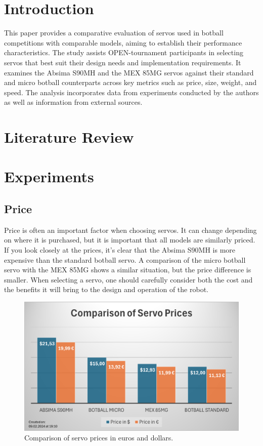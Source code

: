 \documentclass[conference]{IEEEtran}
\begin{document}
\section{Introduction}
This paper provides a comparative evaluation of servos used in botball competitions with comparable models, aiming to establish their performance characteristics. The study assists OPEN-tournament participants in selecting servos that best suit their design needs and implementation requirements. It examines the Absima S90MH and the MEX 85MG servos against their standard and micro botball counterparts across key metrics such as price, size, weight, and speed. The analysis incorporates data from experiments conducted by the authors as well as information from external sources.

\section{Literature Review}

\section{Experiments}
\subsection{Price}
Price is often an important factor when choosing servos. It can change depending on where it is purchased, but it is important that all models are similarly priced. If you look closely at the prices, it's clear that the Absima S90MH is more expensive than the standard botball servo. A comparison of the micro botball servo with the MEX 85MG shows a similar situation, but the price difference is smaller. When selecting a servo, one should carefully consider both the cost and the benefits it will bring to the design and operation of the robot.

\begin{figure}[H]
\centering
\includegraphics[width=\linewidth]{price_comparison_chart.png}
\caption{Comparison of servo prices in euros and dollars.}
\label{fig:price_comparison}
\end{figure}
\end{document}
